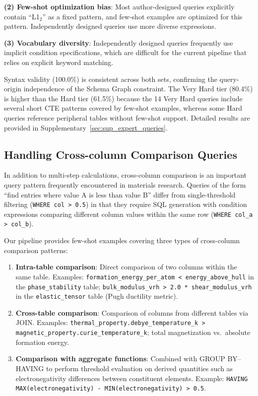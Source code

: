 \documentclass{npj-compt.mater}
\begin{document}
\textbf{(2) Few-shot optimization bias}:
Most author-designed queries explicitly contain ``L1$_2$'' as a
fixed pattern, and few-shot examples are optimized for this pattern.
Independently designed queries use more diverse expressions.

\textbf{(3) Vocabulary diversity}:
Independently designed queries frequently use implicit condition
specifications, which are difficult for the current pipeline that
relies on explicit keyword matching.

Syntax validity (100.0\%) is consistent across both sets,
confirming the query-origin independence of the Schema Graph
constraint.
The Very Hard tier (80.4\%) is higher than the Hard tier (61.5\%)
because the 14 Very Hard queries include several short CTE patterns
covered by few-shot examples, whereas some Hard queries reference
peripheral tables without few-shot support.
Detailed results are provided in Supplementary~\ref{sec:sup_expert_queries}.

\subsection{Handling Cross-column Comparison Queries}
\label{sec:column_comparison}

In addition to multi-step calculations, cross-column comparison is
an important query pattern frequently encountered in materials
research.
Queries of the form ``find entries where value A is less than
value B'' differ from single-threshold filtering
(\texttt{WHERE col > 0.5}) in that they require SQL generation
with condition expressions comparing different column values
within the same row (\texttt{WHERE col\_a > col\_b}).

Our pipeline provides few-shot examples covering three types of
cross-column comparison patterns:
\begin{enumerate}
  \item \textbf{Intra-table comparison}:
    Direct comparison of two columns within the same table.
    Examples: \texttt{formation\_energy\_per\_atom < energy\_above\_hull}
    in the \texttt{phase\_stability} table;
    \texttt{bulk\_modulus\_vrh > 2.0 * shear\_modulus\_vrh}
    in the \texttt{elastic\_tensor} table (Pugh ductility metric).
  \item \textbf{Cross-table comparison}:
    Comparison of columns from different tables via JOIN.
    Examples: \texttt{thermal\_property.debye\_temperature\_k >
    magnetic\_property.curie\_temperature\_k};
    total magnetization vs.\ absolute formation energy.
  \item \textbf{Comparison with aggregate functions}:
    Combined with GROUP BY--HAVING to perform threshold evaluation
    on derived quantities such as electronegativity differences
    between constituent elements.
    Example:
    \texttt{HAVING MAX(electronegativity) - MIN(electronegativity) > 0.5}.
\end{enumerate}
\end{document}
